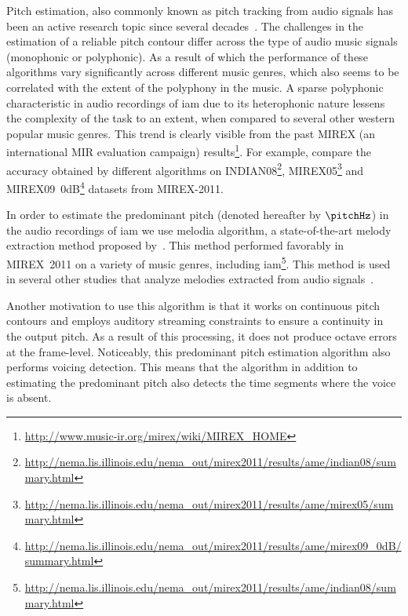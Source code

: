 {Pitch estimation, also commonly known as pitch tracking from audio signals has been an active research topic since several decades~\citep{salamon:phd:13}. The challenges in the estimation of a reliable pitch contour differ across the type of audio music signals (monophonic or polyphonic). As a result of which the performance of these algorithms vary significantly across different music genres, which also seems to be correlated with the extent of the polyphony in the music. A sparse polyphonic characteristic in audio recordings of \gls{iam} due to its heterophonic nature lessens the complexity of the task to an extent, when compared to several other western popular music genres. This trend is clearly visible from the past MIREX (an international MIR evaluation campaign) results\footnote{\url{http://www.music-ir.org/mirex/wiki/MIREX_HOME}}. For example, compare the accuracy obtained by different algorithms on INDIAN08\footnote{\url{http://nema.lis.illinois.edu/nema_out/mirex2011/results/ame/indian08/summary.html}},  MIREX05\footnote{\url{http://nema.lis.illinois.edu/nema_out/mirex2011/results/ame/mirex05/summary.html}} and  MIREX09~0dB\footnote{\url{http://nema.lis.illinois.edu/nema_out/mirex2011/results/ame/mirex09_0dB/summary.html}} datasets from MIREX-2011. 

In order to estimate the predominant pitch (denoted hereafter by $\pitchHz$) in the audio recordings of \gls{iam} we use \gls{melodia} algorithm, a state-of-the-art melody extraction method proposed by~\cite{Salamon2012}. This method performed favorably in MIREX~2011 on a variety of music genres, including \gls{iam}\footnote{\url{http://nema.lis.illinois.edu/nema_out/mirex2011/results/ame/indian08/summary.html}}. This method is used in several other studies that analyze melodies extracted from audio signals~\citep{Dutta2014,Ishwar2013,Rao2014,koduri2014intonation,senturk2013score,pikrakis2012tracking}.

Another motivation to use this algorithm is that it works on continuous pitch contours and employs auditory streaming constraints to ensure a continuity in the output pitch. As a result of this processing, it does not produce octave errors at the frame-level. Noticeably, this predominant pitch estimation algorithm also performs voicing detection. This means that the algorithm in addition to estimating the predominant pitch also detects the time segments where the voice is absent. %

}
